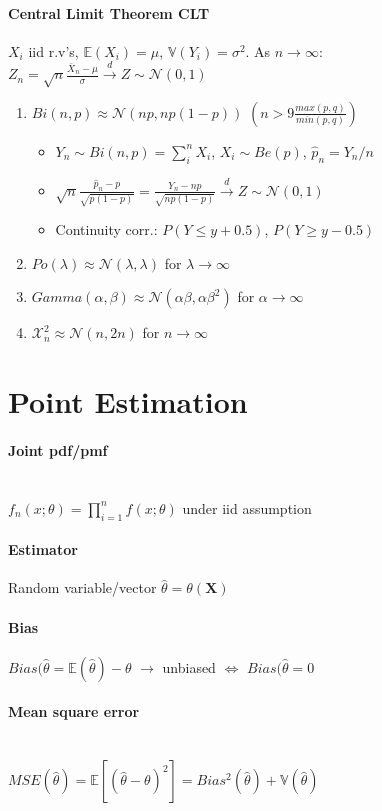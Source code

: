 \documentclass[paper=a4,fontsize=8pt,pagesize,DIV=calc]{scrartcl}
\newcounter{row}
\begin{document}
\begin{multicols}{3}
\paragraph{Central Limit Theorem CLT} $X_i$ iid r.v's, $\mathbb{E}(X_i)=\mu$, $\mathbb{V}(Y_i)=\sigma^2$. As $n \rightarrow \infty$: $Z_n=\sqrt{n}\frac{\bar{X}_n-\mu}{\sigma}\xrightarrow{d} Z \sim \mathcal{N}(0,1)$
\begin{enumerate}
\item $Bi(n,p)\approx\mathcal{N}(np,np(1-p))$ $\left(n>9\frac{max(p,q)}{min(p,q)}\right)$
\begin{itemize}
\item $Y_n\sim Bi(n,p)=\sum^n_i X_i$, $X_i \sim Be(p)$, $\hat{p}_n=Y_n/n$
\item $\sqrt{n}\frac{\hat{p}_n-p}{\sqrt{p(1-p)}}=\frac{Y_n-np}{\sqrt{np(1-p)}}\xrightarrow{d} Z \sim \mathcal{N}(0,1)$
\item Continuity corr.: $P(Y\leq y+0.5)$, $P(Y\geq y-0.5)$
\end{itemize}
\item $Po(\lambda)\approx \mathcal{N}(\lambda,\lambda)$ for $\lambda\rightarrow \infty$
\item $Gamma(\alpha,\beta)\approx \mathcal{N}(\alpha\beta,\alpha\beta^2)$ for $\alpha\rightarrow \infty$
\item $\mathcal{X}^2_n\approx \mathcal{N}(n,2n)$ for $n\rightarrow \infty$
\end{enumerate}

\section{Point Estimation}
\paragraph{Joint pdf/pmf}~~\\ $f_n(x;\theta)=\prod^n_{i=1}f(x;\theta)$ under iid assumption
\paragraph{Estimator} Random variable/vector $\hat{\theta}= \theta(\textbf{X})$ 
\paragraph{Bias} $Bias(\hat{\theta}=\mathbb{E}(\hat{\theta})-\theta$ $\rightarrow$ unbiased $\Leftrightarrow$ $Bias(\hat{\theta}=0$
\paragraph{Mean square error}~~\\ $MSE(\hat{\theta})=\mathbb{E}[(\hat{\theta}-\theta)^2]=Bias^2(\hat{\theta})+\mathbb{V}(\hat{\theta})$

\end{multicols}
\end{document}
